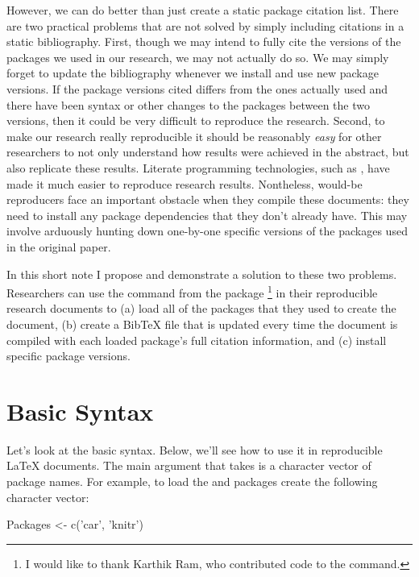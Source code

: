 However, we can do better than just create a static package citation list. There are two practical problems that are not solved by simply including citations in a static bibliography. First, though we may intend to fully cite the versions of the packages we used in our research, we may not actually do so. We may simply forget to update the bibliography whenever we install and use new package versions. If the package versions cited differs from the ones actually used and there have been syntax or other changes to the packages between the two versions, then it could be very difficult to reproduce the research. Second, to make our research really reproducible it should be reasonably \emph{easy} for other researchers to not only understand how results were achieved in the abstract, but also replicate these results. Literate programming technologies, such as  \citep{R-knitr}, have made it much easier to reproduce research results. Nontheless, would-be reproducers face an important obstacle when they compile these documents: they need to install any package dependencies that they don't already have. This may involve arduously hunting down one-by-one specific versions of the packages used in the original paper. 

In this short note I propose and demonstrate a solution to these two problems. Researchers can use the  command from the  package \citep{R-repmis}\footnote{I would like to thank Karthik Ram, who contributed code to the command.} in their reproducible research documents to (a) load all of the packages that they used to create the document, (b) create a BibTeX file that is updated every time the document is compiled with each loaded package’s full citation information, and (c) install specific package versions. 

\section{Basic Syntax}

Let's look at the basic  syntax. Below, we'll see how to use it in reproducible LaTeX documents. The main argument that  takes is a character vector of package names. For example, to load the  \citep{R-car} and  packages create the following character vector:

\begin{example}
  Packages <- c('car', 'knitr')
\end{example}

